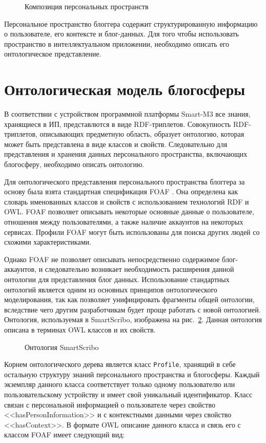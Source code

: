 \begin{figure}[h]
\centerline{
}
\caption{Композиция персональных пространств}
\label{personal-spaces}
\end{figure}

Персональное пространство блоггера содержит структурированную информацию о пользователе, его контексте и блог-данных. Для того чтобы использовать пространство в интеллектуальном приложении, необходимо описать его онтологическое представление.

\section{Онтологическая модель блогосферы}

В соответствии с устройством программной платформы Smart-M3 все знания, хранящиеся в ИП, представлются в виде RDF-триплетов. Совокупность RDF-триплетов, описывающих предметную область, образует онтологию, которая может быть представлена в виде классов и свойств. Следовательно для представления и хранения данных персонального пространства, включающих блогосферу, необходимо описать онтологию.

Для онтологического представления персонального пространства блоггера за основу была взята стандартная спецификация FOAF \cite{foaf}. Она определена как словарь именованных классов и свойств с использованием технологий RDF и OWL. FOAF позволяет описывать некоторые основные данные о пользователе, отношения между пользователями, а также наличие аккаунтов на некоторых сервисах. Профили FOAF могут быть использованы для поиска других людей со схожими характеристиками.

Однако FOAF не позволяет описывать непосредственно содержимое блог-аккаунтов, и следовательно возникает необходимость расширения данной онтологии для представления блог данных. Использование стандартных онтологий является одним из основных принципов онтологического моделирования, так как позволяет унифицировать фрагменты общей онтологии, вследствие чего другим разработчикам будет проще работать с новой онтологией. Онтология, используемая в SmartScribo, изображена на рис.~\ref{ont-tree}. Данная онтология описана в терминах OWL классов и их свойств.
\begin{figure}[h]
\centerline{
}
\caption{Онтология SmartScribo}
\label{ont-tree}
\end{figure}

Корнем онтологического дерева является класс {\tt Profile}, хранящий в себе остальную структуру знаний персонального пространства и блогосферы. Каждый экземпляр данного класса соответствует только одному пользователю или пользовательскому устройству и имеет свой уникальный идентификатор. Класс связан с персональной информацией о пользователе через свойство <<hasPersonInformation>> и с контекстными данными через свойство <<hasContext>>.
В формате OWL описание данного класса и связь его с классом FOAF имеет следующий вид:

